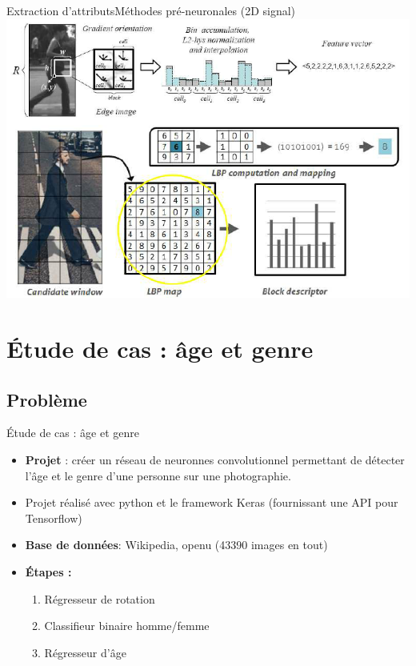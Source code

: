 \documentclass[compress]{beamer}
\begin{document}
\begin{frame}{Extraction d'attributs}{Méthodes pré-neuronales (2D signal)}
\centering
\includegraphics[width=0.9\linewidth]{resources/beatles}
\end{frame}

\section{\'Etude de cas : âge et genre}
\subsection{Problème}
\begin{frame}{\'Etude de cas : âge et genre}
  \begin{itemize}
    \item
    \textbf{\color{fibeamer@orange}Projet} : créer un réseau de neuronnes convolutionnel
    permettant de détecter l'{\color{fibeamer@orange}âge} et le {\color{fibeamer@orange}genre} d'une personne sur une photographie.
    \item Projet réalisé avec python et le framework Keras (fournissant une API pour Tensorflow)
    \item \textbf{\color{fibeamer@orange}Base de données}: Wikipedia, openu (43390 images en tout)
    \item \textbf{\color{fibeamer@orange}\'Etapes :}
    \begin{enumerate}
      \item Régresseur de rotation
      \item Classifieur binaire homme/femme
      \item Régresseur d'âge
    \end{enumerate}
  \end{itemize}
\end{frame}
\end{document}
